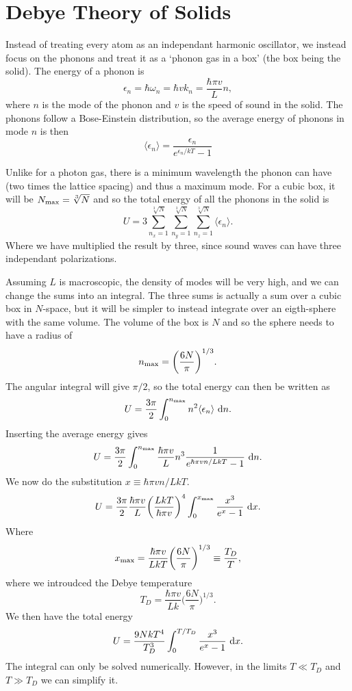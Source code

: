 \documentclass[a4paper, 11pt, notitlepage, english]{article}
\renewcommand{\d}{{\rm d}}
\newcommand{\eps}{\epsilon}
\begin{document}
\clearpage

\section*{Debye Theory of Solids}

Instead of treating every atom as an independant harmonic oscillator, we instead focus on the phonons and treat it as a `phonon gas in a box' (the box being the solid).  The energy of a phonon is 
$$\eps_n = \hbar \omega_n = \hbar v k_n = \frac{\hbar \pi v}{L}n,$$
where $n$ is the mode of the phonon and $v$ is the speed of sound in the solid. The phonons follow a Bose-Einstein distribution, so the average energy of phonons in mode $n$ is then 
$$\langle \eps_n \rangle = \frac{\eps_n}{e^{\eps_n/kT} - 1}$$

Unlike for a photon gas, there is a minimum wavelength the phonon can have (two times the lattice spacing) and thus a maximum mode. For a cubic box, it will be $N_{\rm max} = \sqrt[3]{N}$ and so the total energy of all the phonons in the solid is
$$U = 3\sum_{n_x=1}^{\sqrt[3]{N}}\sum_{n_y=1}^{\sqrt[3]{N}}\sum_{n_z=1}^{\sqrt[3]{N}} \langle \eps_n \rangle.$$
Where we have multiplied the result by three, since sound waves can have three independant polarizations.

Assuming $L$ is macroscopic, the density of modes will be very high, and we can change the sums into an integral. The three sums is actually a sum over a cubic box in $N$-space, but it will be simpler to instead integrate over an eigth-sphere with the same volume. The volume of the box is $N$ and so the sphere needs to have a radius of
$$n_{\rm max} = \bigg(\frac{6N}{\pi}\bigg)^{1/3}.$$
The angular integral will give $\pi/2$, so the total energy can then be written as
$$U = \frac{3\pi}{2} \int_{0}^{n_{\rm max}}  n^2 \langle \eps_n \rangle \ \d n.$$
Inserting the average energy gives
$$U = \frac{3\pi}{2} \int_{0}^{n_{\rm max}} \frac{\hbar \pi v}{L}n^3 \frac{1}{e^{\hbar \pi v n/LkT} - 1} \ \d n.$$ 
We now do the substitution $x \equiv \hbar \pi v n/LkT$.
$$U = \frac{3\pi}{2} \frac{\hbar \pi v}{L} \bigg(\frac{LkT}{\hbar\pi v}\bigg)^4 \int_0^{x_{\rm max}} \frac{x^3}{e^x-1} \ \d x.$$
Where 
$$x_{\rm max} = \frac{\hbar\pi v}{LkT} \bigg(\frac{6N}{\pi}\bigg)^{1/3} \equiv \frac{T_D}{T},$$
where we introudced the Debye temperature
$$T_D = \frac{\hbar\pi v}{Lk} \bigg(\frac{6N}{\pi}\bigg)^{1/3}.$$
We then have the total energy
$$U = \frac{9NkT^4}{T_D^3}\int_0^{T/T_D} \frac{x^3}{e^x - 1} \ \d x.$$
The integral can only be solved numerically. However, in the limits $T\ll T_D$ and $T \gg T_D$ we can simplify it.
\end{document}
